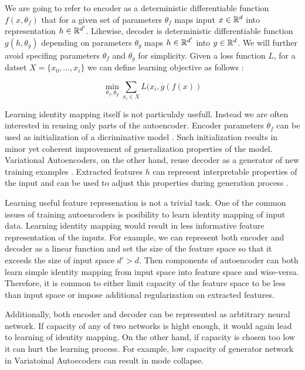 We are going to refer to encoder as a deterministic differentiable function $f(x, \theta_f)$ that for a given set of parameters $\theta_f$ maps input $x\in \Bbb{R}^d$ into representation $h \in \Bbb{R}^{d'}$.
Likewise, decoder is deterministic differentiable function $g(h, \theta_g)$ depending on parameters $\theta_g$ maps $h\in\Bbb{R}^{d'}$ into $y\in \Bbb{R}^d$. We will further avoid specifing parameters $\theta_f$ and $\theta_g$ for simplicity.
Given a loss function $L$, for a datset $X=\{x_0, ..., x_i\}$ we can define learning objective as follows \cite{Good2016}:

\begin{equation}\label{eq:primal}
\min_{\theta_f, \theta_g}\sum\limits_{x_i \in X}{L(x_i, g(f(x))}
\end{equation}

Learning identity mapping itself is not particulaly usefull.
Instead we are often interested in reusing only parts of the autoencoder.
Encoder parameters $\theta_f$ can be used as initialization of a dicriminative model \cite{Masci2011, Vincent2010, Zhao2015}.
Such initialization results in minor yet coherent improvement of generalization properties of the model.
Variational Autoencoders, on the other hand, reuse decoder as a generator of new training examples \cite{Kingma2013}.
Extracted features $h$ can represent interpretable properties of the input and can be used to adjust this
properties during generation process \cite{Kulkarni2015, Whitney2016}.

Learning useful feature represenation is not a trivial task.
One of the common issues of training autoencoders is posibility to learn identity mapping of input data.
Learning identity mapping would result in less informative feature representation of the inputs.
For example, we can represent both encoder and decoder as a linear function and set the size of the feature space so that it exceeds the size of input space $d' > d$.
Then components of autoencoder can both learn simple identity mapping from input space into feature space and wise-versa.
Therefore, it is common to either limit capacity of the feature space to be less than input space or impose additional regularization on extracted features.

Additionally, both encoder and decoder can be represented as arbtitrary neural network.
If capacity of any of two networks is hight enough, it would again lead to learning of identity mapping.
On the other hand, if capacity is chosen too low it can hurt the learning process.
For example, low capacity of generator network in Variatoinal Autoecoders can result in mode collapse.


